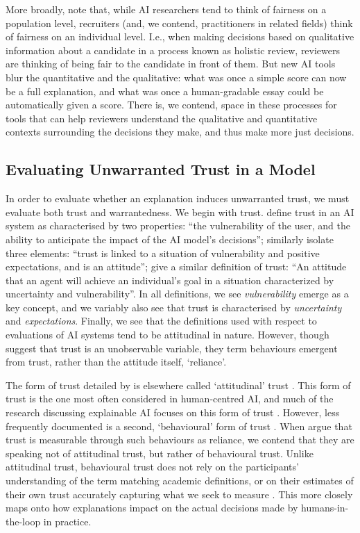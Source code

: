 More broadly, \textcite{alvero_ai_2020} note that, while AI researchers tend to think of fairness on a population level, recruiters (and, we contend, practitioners in related fields) think of fairness on an individual level. I.e., when making decisions based on qualitative information about a candidate in a process known as holistic review, reviewers are thinking of being fair to the candidate in front of them. But new AI tools blur the quantitative and the qualitative: what was once a simple score can now be a full explanation, and what was once a human-gradable essay could be automatically given a score. There is, we contend, space in these processes for tools that can help reviewers understand the qualitative and quantitative contexts surrounding the decisions they make, and thus make more just decisions.

\subsection{Evaluating Unwarranted Trust in a Model}
In order to evaluate whether an explanation induces unwarranted trust, we must evaluate both trust and warrantedness. We begin with trust. \textcite{jacovi_formalizing_2021} define trust in an AI system as characterised by two properties: ``the vulnerability of the user, and the ability to anticipate the impact of the AI model's decisions''; \textcite{vereschak_how_2021} similarly isolate three elements: ``trust is linked to a situation of vulnerability and positive expectations, and is an attitude''; \textcite{lee_trust_2004} give a similar definition of trust: ``An attitude that an agent will achieve an individual's goal in a situation characterized by uncertainty and vulnerability''. In all definitions, we see \emph{vulnerability} emerge as a key concept, and we variably also see that trust is characterised by \emph{uncertainty} and \emph{expectations}. Finally, we see that the definitions used with respect to evaluations of AI systems tend to be attitudinal in nature. However, though \textcite{vereschak_how_2021} suggest that trust is an unobservable variable, they term behaviours emergent from trust, rather than the attitude itself, `reliance'. 

The form of trust detailed by \textcite{vereschak_how_2021} is elsewhere called `attitudinal' trust \cite{crites_measuring_1994}. This form of trust is the one most often considered in human-centred AI, and much of the research discussing explainable AI focuses on this form of trust \cite{vereschak_how_2021, ford_play_2020, bansal_does_2021, yin_understanding_2019}. However, less frequently documented is a second, `behavioural' form of trust \cite{crites_measuring_1994}. When \textcite{jacovi_formalizing_2021,lee_trust_2004} argue that trust is measurable through such behaviours as reliance, we contend that they are speaking not of attitudinal trust, but rather of behavioural trust. Unlike attitudinal trust, behavioural trust does not rely on the participants' understanding of the term matching academic definitions, or on their estimates of their own trust accurately capturing what we seek to measure \cite{jacovi_formalizing_2021}. This more closely maps onto how explanations impact on the actual decisions made by humans-in-the-loop in practice.

